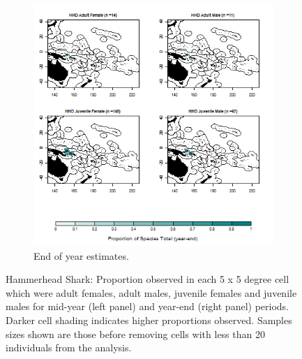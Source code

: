 \documentclass[12pt]{SCreport}
\begin{document}
\begin{landscape}
\begin{figure}
\begin{subfigure}[b]{0.6\textwidth}
       \includegraphics[width=\textwidth]{../GRAPHICS/Defined/BI_23_Map_maturity_sex_HHD}
       \caption{End of year estimates.}
       \label{fig:BI_23}
   \end{subfigure}
\caption{Hammerhead Shark: Proportion observed in each 5 x 5 degree cell which were adult females, adult males, juvenile females and juvenile males for mid-year (left panel) and year-end (right panel) periods. Darker cell shading indicates higher proportions observed. Samples sizes shown are those before removing cells with less than 20 individuals from the analysis. }
\label{BI_M03} 
\end{figure}
\end{landscape}
\end{document}
